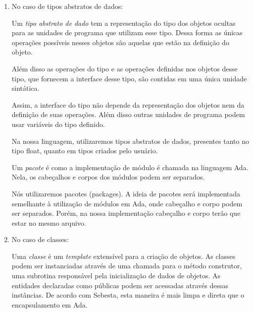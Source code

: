 \begin{enumerate}
        \item
        No caso de tipos abstratos de dados:

        Um \emph{tipo abstrato de dado} tem a representação do tipo dos objetos
        ocultas para as unidades de programa que utilizam esse tipo. Dessa forma as
        únicas operações possíveis nesses objetos são aquelas que estão na
        definição do objeto.

        Além disso as operações do tipo e as operações definidas nos objetos
        desse tipo, que fornecem a interface desse tipo, são contidas em uma
        única unidade sintática.

        Assim,  a interface do tipo não depende da representação dos objetos
        nem da definição de suas operações. Além disso outras unidades de
        programa podem usar variáveis do tipo definido.

        Na nossa linguagem, utilizaremos tipos abstratos de dados, presentes
        tanto no tipo float, quanto em tipos criados pelo usuário.



        Um \emph{pacote} é como a implementação de módulo é chamada na
        linguagem Ada. Nela, os cabeçalhos e corpos dos módulos podem ser
        separados.

        Nós utilizaremos pacotes (packages). A ideia de pacotes será
        implementada semelhante à utilização de módulos em Ada, onde cabeçalho
        e corpo podem ser separados. Porém, na nossa implementação cabeçalho e
        corpo terão que estar no mesmo arquivo.

        \item
        No caso de classes:

        Uma \emph{classe} é um \emph{template} extensível para a criação de
        objetos. As classes podem ser instanciadas através de uma chamada para
        o método construtor, uma subrotina responsável pela inicialização de
        dados de objetos. As entidades declaradas como públicas podem ser
        acessadas através dessas instâncias. De acordo com Sebesta, esta
        maneira é mais limpa e direta que o encapsulamento em Ada.


\end{enumerate}
